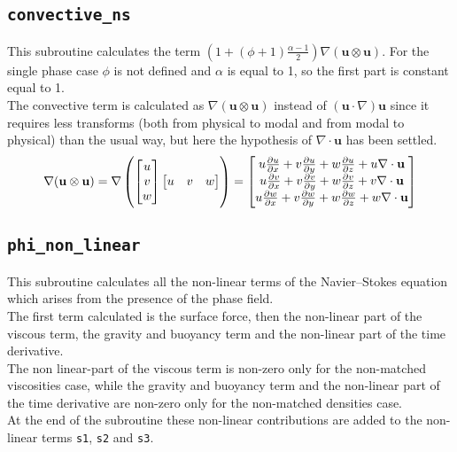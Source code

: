 \subsection{\texttt{convective\_ns}}
This subroutine calculates the term $\left(1+(\phi+1)\frac{\alpha-1}{2}\right)\nabla(\mathbf{u}\otimes\mathbf{u})$. For the single phase case $\phi$ is not defined and $\alpha$ is equal to 1, so the first part is constant equal to 1.\\
The convective term is calculated as $\nabla(\mathbf{u}\otimes\mathbf{u})$ instead of $(\mathbf{u}\cdot\nabla) \mathbf{u}$ since it requires less transforms (both from physical to modal and from modal to physical) than the usual way, but here the hypothesis of $\nabla\cdot \mathbf{u}$ has been settled.
\[
\nabla(\mathbf{u}\otimes\mathbf{u})=\nabla \left( 
\begin{bmatrix}
u \\
v \\
w\\
\end{bmatrix}
\begin{bmatrix}
u & v & w \\
\end{bmatrix}
\right)=
\begin{bmatrix}
u\frac{\partial u}{\partial x}+v\frac{\partial u}{\partial y}+w\frac{\partial u}{\partial z}+u \nabla\cdot\mathbf{u}\\
u\frac{\partial v}{\partial x}+v\frac{\partial v}{\partial y}+w\frac{\partial v}{\partial z}+v \nabla\cdot\mathbf{u}\\
u\frac{\partial w}{\partial x}+v\frac{\partial w}{\partial y}+w\frac{\partial w}{\partial z}+w \nabla\cdot\mathbf{u}\\
\end{bmatrix}
\]
\def\arraystretch{1}

\subsection{\texttt{phi\_non\_linear}}
This subroutine calculates all the non-linear terms of the Navier--Stokes equation which arises from the presence of the phase field.\\ 
The first term calculated is the surface force, then the non-linear part of the viscous term, the gravity and buoyancy term and the non-linear part of the time derivative.\\
The non linear-part of the viscous term is non-zero only for the non-matched viscosities case, while the gravity and buoyancy term and the non-linear part of the time derivative are non-zero only for the non-matched densities case.\\
At the end of the subroutine these non-linear contributions are added to the non-linear terms \texttt{s1}, \texttt{s2} and \texttt{s3}.

